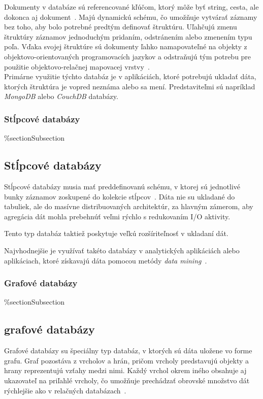 Dokumenty v databáze sú referencované kľúčom, ktorý môže byť string, cesta, ale dokonca aj dokument~\cite{NoSQLDBvsRealtionDB}. Majú dynamickú schému, čo umožňuje vytvárať záznamy bez toho, aby bolo potrebné predtým definovať štruktúru. Uľahčujú zmenu štruktúry záznamov jednoduchým pridaním, odstránením alebo zmenením typu poľa. Vďaka svojej štruktúre sú dokumenty ľahko namapovateľné na objekty z objektovo-orientovaných programovacích jazykov a odstraňujú tým potrebu pre použitie objektovo-relačnej mapovacej vrstvy~\cite{MongoDBvsMySQLCompared}.
\\

Primárne využitie týchto databáz je v aplikáciách, ktoré potrebujú ukladať dáta, ktorých štruktúra je vopred neznáma alebo sa mení. Predstaviteľmi sú napríklad \textit{MongoDB} alebo \textit{CouchDB} databázy.

%
%
{
	\subsubsection{Stĺpcové databázy}
}
{
	\%section{Subsection}
	\subsection{Stĺpcové databázy}
}
\label{subsubsection:column_db}
Stĺpcové databázy musia mať preddefinovanú schému, v ktorej sú jednotlivé bunky záznamov zoskupené do kolekcie stĺpcov~\cite{MongoDBvsMySQL2015}. Dáta nie su ukladané do tabuliek, ale do masívne distribuovaných architektúr, za hlavným zámerom, aby agregácia dát mohla prebehnúť veľmi rýchlo s redukovaním I/O aktivity.

Tento typ databáz taktiež poskytuje veľkú rozšíriteľnosť v ukladaní dát.

Najvhodnejšie je využívať takéto databázy v analytických aplikáciách alebo aplikáciach, ktoré získavajú dáta pomocou metódy \textit{data mining}~\cite{NoSQLDBvsRealtionDB}.

%
%
{
	\subsubsection{Grafové databázy}
}
{
	\%section{Subsection}
	\subsection{grafové databázy}
}
\label{subsubsection:graph_db}
Grafové databázy su špeciálny typ databáz, v ktorých sú dáta uložene vo forme grafu. Graf pozostáva z vrcholov a hrán, pričom vrcholy predstavujú objekty a hrany reprezentujú vzťahy medzi nimi. Každý vrchol okrem iného obsahuje aj ukazovateľ na priľahlé vrcholy, čo umožňuje prechádzať obrovské množstvo dát rýchlejšie ako v relačných databázach~\cite{NoSQLDBvsRealtionDB}.

